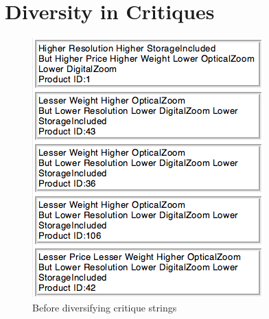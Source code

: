 \section{Diversity in Critiques}
\label{sec:div}
\begin{figure}
\centering
\begin{minipage}{.45\textwidth}
  \centering
  \includegraphics[width=1\linewidth]{figures-bharath/diversity1.jpg}
  \caption{Before diversifying critique strings}
  \label{fig:beforeDiv}
\end{minipage}%
\;\;\;\;\;\;
\begin{minipage}{.45\textwidth}
  \centering

\end{minipage}
\end{figure}
